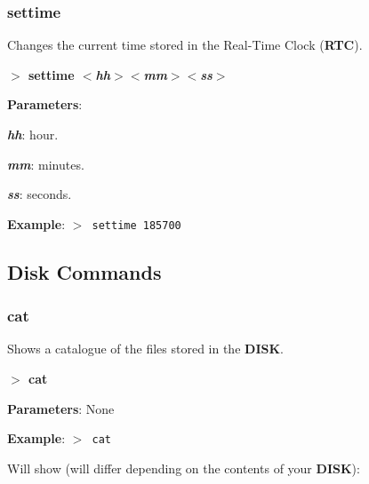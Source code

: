         \subsubsection{{settime}}
        Changes the current time stored in the Real-Time Clock (\textbf{RTC}).

        \hspace{1.9cm}\textbf{$>$ settime \textit{$<$hh$>$$<$mm$>$$<$ss$>$}}

        \textbf{Parameters}:

        \hspace{1cm}\textbf{\textit{hh}}: hour.

        \hspace{1cm}\textbf{\textit{mm}}: minutes.

        \hspace{1cm}\textbf{\textit{ss}}: seconds.

        \textbf{Example}: \texttt{$>$ settime 185700}

    \subsection{Disk Commands}\label{dskcmds}
        \subsubsection{{cat}}
        \label{cmd:cat}

        Shows a catalogue of the files stored in the \textbf{DISK}.

        \hspace{1.9cm}\textbf{$>$ cat}

        \textbf{Parameters}: None

        \textbf{Example}: \texttt{$>$ cat}

        Will show (will differ depending on the contents of your \textbf{DISK}):

        \texttt{
        }

